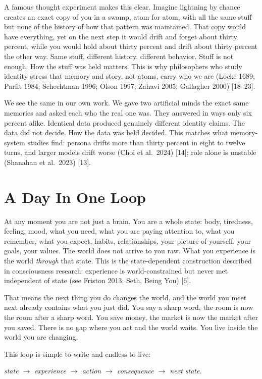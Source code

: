 \documentclass[11pt,a4paper]{article}
\begin{document}
A famous thought experiment makes this clear. Imagine lightning by chance creates an exact copy of you in a swamp, atom for atom, with all the same stuff but none of the history of how that pattern was maintained. That copy would have everything, yet on the next step it would drift and forget about thirty percent, while you would hold about thirty percent and drift about thirty percent the other way. Same stuff, different history, different behavior. Stuff is not enough. How the stuff was held matters. This is why philosophers who study identity stress that memory and story, not atoms, carry who we are (Locke 1689; Parfit 1984; Schechtman 1996; Olson 1997; Zahavi 2005; Gallagher 2000) [18--23].

We see the same in our own work. We gave two artificial minds the exact same memories and asked each who the real one was. They answered in ways only six percent alike. Identical data produced genuinely different identity claims. The data did not decide. How the data was held decided. This matches what memory-system studies find: persona drifts more than thirty percent in eight to twelve turns, and larger models drift worse (Choi et al.\ 2024) [14]; role alone is unstable (Shanahan et al.\ 2023) [13].

\section{A Day In One Loop}

At any moment you are not just a brain. You are a whole state: body, tiredness, feeling, mood, what you need, what you are paying attention to, what you remember, what you expect, habits, relationships, your picture of yourself, your goals, your values. The world does not arrive to you raw. What you experience is the world \emph{through} that state. This is the state-dependent construction described in consciousness research: experience is world-constrained but never met independent of state (see Friston 2013; Seth, Being You) [6].

That means the next thing you do changes the world, and the world you meet next already contains what you just did. You say a sharp word, the room is now the room after a sharp word. You save money, the market is now the market after you saved. There is no gap where you act and the world waits. You live inside the world you are changing.

This loop is simple to write and endless to live:

\textit{state $\rightarrow$ experience $\rightarrow$ action $\rightarrow$ consequence $\rightarrow$ next state.}
\end{document}
